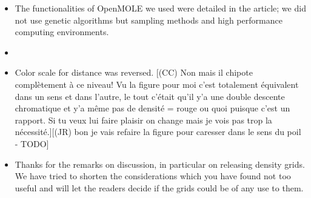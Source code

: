\documentclass[11pt,a4paper,sans]{moderncv}        %
\begin{document}
\begin{itemize}
	\item The functionalities of OpenMOLE we used were detailed in the article; we did not use genetic algorithms but sampling methods and high performance computing environments.
	
	\item {}
	
    
	\item Color scale for distance was reversed.
    [(CC) Non mais il chipote complètement à ce niveau! Vu la figure pour moi c'est totalement équivalent dans un sens et dans l'autre, le tout c'était qu'il y'a une double descente chromatique et y'a même pas de densité = rouge ou quoi puisque c'est un rapport. Si tu veux lui faire plaisir on change mais je vois pas trop la nécessité.][(JR) bon je vais refaire la figure pour caresser dans le sens du poil - TODO]
	
	\item Thanks for the remarks on discussion, in particular on releasing density grids. We have tried to shorten the considerations which you have found not too useful and will let the readers decide if the grids could be of any use to them.
\end{itemize}
\end{document}
